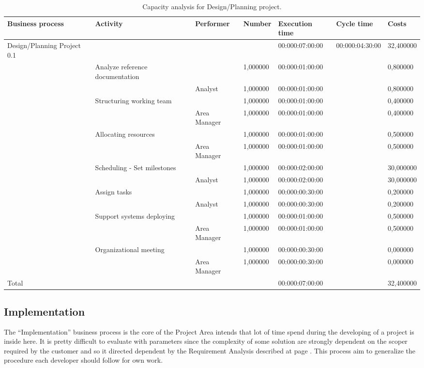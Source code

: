 \begin{landscape}
\begin{table}
\centering
{\tiny
\begin{tabular}{|l|l|l|l|l|l|l|}
Business process&Activity&Performer&Number&Execution time&Cycle time&Costs\\
\hline
Design/Planning Project 0.1&&&&00:000:07:00:00&00:000:04:30:00&32,400000\\
\hline
&Analyze reference documentation &&1,000000&00:000:01:00:00&&0,800000\\
\hline
&&Analyst &1,000000&00:000:01:00:00&&0,800000\\
\hline
&Structuring working team &&1,000000&00:000:01:00:00&&0,400000\\
\hline
&&Area Manager &1,000000&00:000:01:00:00&&0,400000\\
\hline
&Allocating resources &&1,000000&00:000:01:00:00&&0,500000\\
\hline
&&Area Manager &1,000000&00:000:01:00:00&&0,500000\\
\hline
&Scheduling - Set milestones &&1,000000&00:000:02:00:00&&30,000000\\
\hline
&&Analyst &1,000000&00:000:02:00:00&&30,000000\\
\hline
&Assign tasks &&1,000000&00:000:00:30:00&&0,200000\\
\hline
&&Analyst &1,000000&00:000:00:30:00&&0,200000\\
\hline
&Support systems deploying &&1,000000&00:000:01:00:00&&0,500000\\
\hline
&&Area Manager &1,000000&00:000:01:00:00&&0,500000\\
\hline
&Organizational meeting &&1,000000&00:000:00:30:00&&0,000000\\
\hline
&&Area Manager &1,000000&00:000:00:30:00&&0,000000\\
\hline
Total&&&&00:000:07:00:00&&32,400000
\end{tabular}
}
\caption{Capacity analysis for Design/Planning project.}
\end{table}
\end{landscape}
%

%

\subsection{Implementation}
The ``Implementation'' business process is the core of the Project Area intends that lot of time spend during the developing of a project is inside here. It is pretty difficult to evaluate with parameters since the complexity of some solution are strongly dependent on the scoper required by the customer and so it directed dependent by the Requirement Analysis described at page \pageref{subsec:requirement}. This process aim to generalize the procedure each developer should follow for own work.

